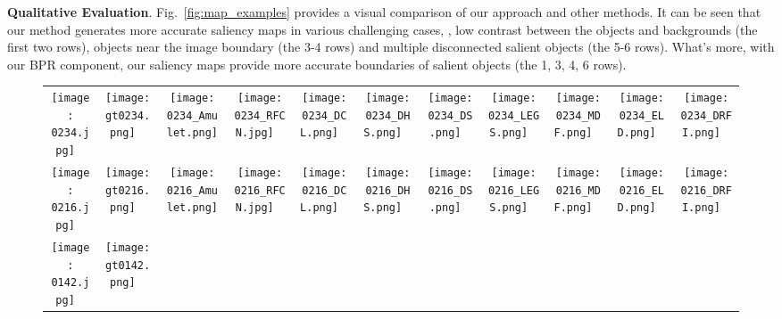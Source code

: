 \documentclass[10pt,twocolumn,letterpaper]{article}
\begin{document}
\textbf{Qualitative Evaluation}. Fig.~\ref{fig:map_examples} provides a visual comparison of our approach and other methods.
It can be seen that our method generates more accurate saliency maps in various challenging cases, \eg, low contrast between the objects and backgrounds (the first two rows), objects near the image boundary (the 3-4 rows) and multiple disconnected salient objects (the 5-6 rows). What's more, with our BPR component, our saliency maps provide more accurate boundaries of salient objects (the 1, 3, 4, 6 rows).
\begin{figure*}
\centering
\begin{tabular}{@{}c@{}c@{}c@{}c@{}c@{}c@{}c@{}c@{}c@{}c@{}c}
\vspace{-1mm}
\texttt{[image: 0234.jpg]} \ &
\texttt{[image: gt0234.png]} \ &
\texttt{[image: 0234\_Amulet.png]} \ &
\texttt{[image: 0234\_RFCN.jpg]} \ &
\texttt{[image: 0234\_DCL.png]} \ &
\texttt{[image: 0234\_DHS.png]} \ &
\texttt{[image: 0234\_DS.png]} \ &
\texttt{[image: 0234\_LEGS.png]} \ &
\texttt{[image: 0234\_MDF.png]} \ &
\texttt{[image: 0234\_ELD.png]} \ &
\texttt{[image: 0234\_DRFI.png]} \ \\
\vspace{-1mm}
\texttt{[image: 0216.jpg]} \ &
\texttt{[image: gt0216.png]} \ &
\texttt{[image: 0216\_Amulet.png]} \ &
\texttt{[image: 0216\_RFCN.jpg]} \ &
\texttt{[image: 0216\_DCL.png]} \ &
\texttt{[image: 0216\_DHS.png]} \ &
\texttt{[image: 0216\_DS.png]} \ &
\texttt{[image: 0216\_LEGS.png]} \ &
\texttt{[image: 0216\_MDF.png]} \ &
\texttt{[image: 0216\_ELD.png]} \ &
\texttt{[image: 0216\_DRFI.png]} \ \\
\vspace{-1mm}
\texttt{[image: 0142.jpg]} \ &
\texttt{[image: gt0142.png]} \ &

\end{tabular}
\end{figure*}
\end{document}
